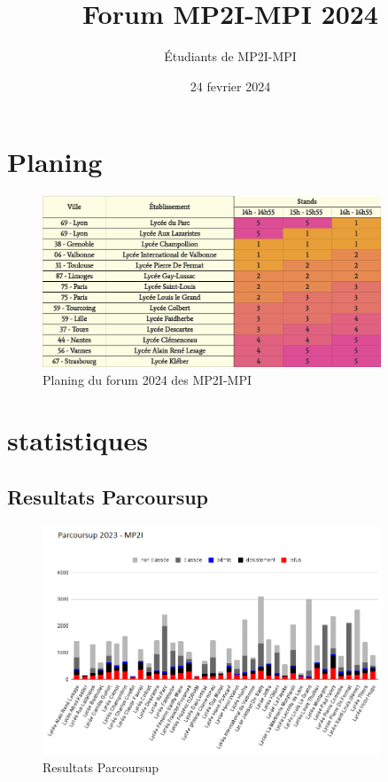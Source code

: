 \documentclass{beamer}
\title{Forum MP2I-MPI 2024}
\author{Étudiants de MP2I-MPI}
\date{24 fevrier 2024}
\begin{document}
\begin{frame}
  \titlepage
\end{frame}


\section{Planing}

\begin{frame}
    \begin{figure}
        \centering
        \includegraphics[width=0.9\textwidth]{ressource_diapo/Planing_2024.png}
        \caption{Planing du forum 2024 des MP2I-MPI}
    \end{figure}
\end{frame}

\section{statistiques}

\subsection{Resultats Parcoursup}

\begin{frame}
    \begin{figure}
        \centering
        \includegraphics[width=0.9\textwidth]{ressource_diapo/Parcoursup_2023.png}
        \caption{Resultats Parcoursup}
    \end{figure}
\end{frame}
\end{document}
